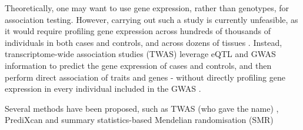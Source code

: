 Theoretically, one may want to 
use
gene expression, rather than genotypes, for association testing.
However, carrying out such a study is currently unfeasible, as it would require profiling gene expression across hundreds of thousands of individuals in both cases and controls, and across dozens of tissues \cite{cano2020gwas}.
Instead,
transcriptome-wide association studies (TWAS) leverage eQTL and GWAS information to predict the gene expression of cases and controls, and then perform direct association of traits and genes - without directly profiling gene expression in every individual included in the GWAS \cite{wainberg2019opportunities}.


Several methods have been proposed, such as TWAS (who gave the name) \cite{gusev2016integrative}, PrediXcan \cite{gamazon2015gene} and summary statistics-based Mendelian randomisation (SMR) \cite{zhu2016integration}
\\



%  


